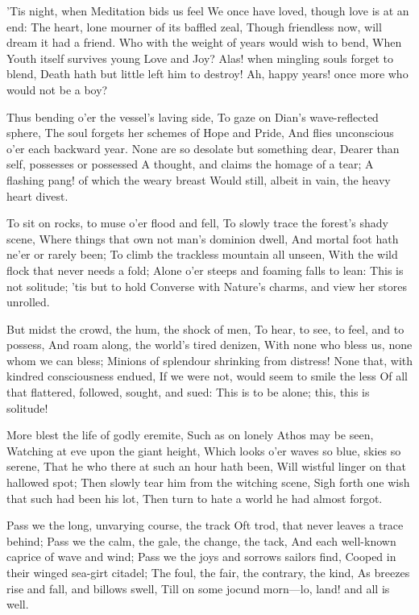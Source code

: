 \documentclass[10pt,twocolumn]{book}
\begin{document}
   'Tis night, when Meditation bids us feel
   We once have loved, though love is at an end:
   The heart, lone mourner of its baffled zeal,
   Though friendless now, will dream it had a friend.
   Who with the weight of years would wish to bend,
   When Youth itself survives young Love and Joy?
   Alas! when mingling souls forget to blend,
   Death hath but little left him to destroy!
Ah, happy years! once more who would not be a boy?


   Thus bending o'er the vessel's laving side,
   To gaze on Dian's wave-reflected sphere,
   The soul forgets her schemes of Hope and Pride,
   And flies unconscious o'er each backward year.
   None are so desolate but something dear,
   Dearer than self, possesses or possessed
   A thought, and claims the homage of a tear;
   A flashing pang! of which the weary breast
Would still, albeit in vain, the heavy heart divest.


   To sit on rocks, to muse o'er flood and fell,
   To slowly trace the forest's shady scene,
   Where things that own not man's dominion dwell,
   And mortal foot hath ne'er or rarely been;
   To climb the trackless mountain all unseen,
   With the wild flock that never needs a fold;
   Alone o'er steeps and foaming falls to lean:
   This is not solitude; 'tis but to hold
Converse with Nature's charms, and view her stores unrolled.


   But midst the crowd, the hum, the shock of men,
   To hear, to see, to feel, and to possess,
   And roam along, the world's tired denizen,
   With none who bless us, none whom we can bless;
   Minions of splendour shrinking from distress!
   None that, with kindred consciousness endued,
   If we were not, would seem to smile the less
   Of all that flattered, followed, sought, and sued:
This is to be alone; this, this is solitude!


   More blest the life of godly eremite,
   Such as on lonely Athos may be seen,
   Watching at eve upon the giant height,
   Which looks o'er waves so blue, skies so serene,
   That he who there at such an hour hath been,
   Will wistful linger on that hallowed spot;
   Then slowly tear him from the witching scene,
   Sigh forth one wish that such had been his lot,
Then turn to hate a world he had almost forgot.


   Pass we the long, unvarying course, the track
   Oft trod, that never leaves a trace behind;
   Pass we the calm, the gale, the change, the tack,
   And each well-known caprice of wave and wind;
   Pass we the joys and sorrows sailors find,
   Cooped in their winged sea-girt citadel;
   The foul, the fair, the contrary, the kind,
   As breezes rise and fall, and billows swell,
Till on some jocund morn---lo, land! and all is well.
\end{document}
